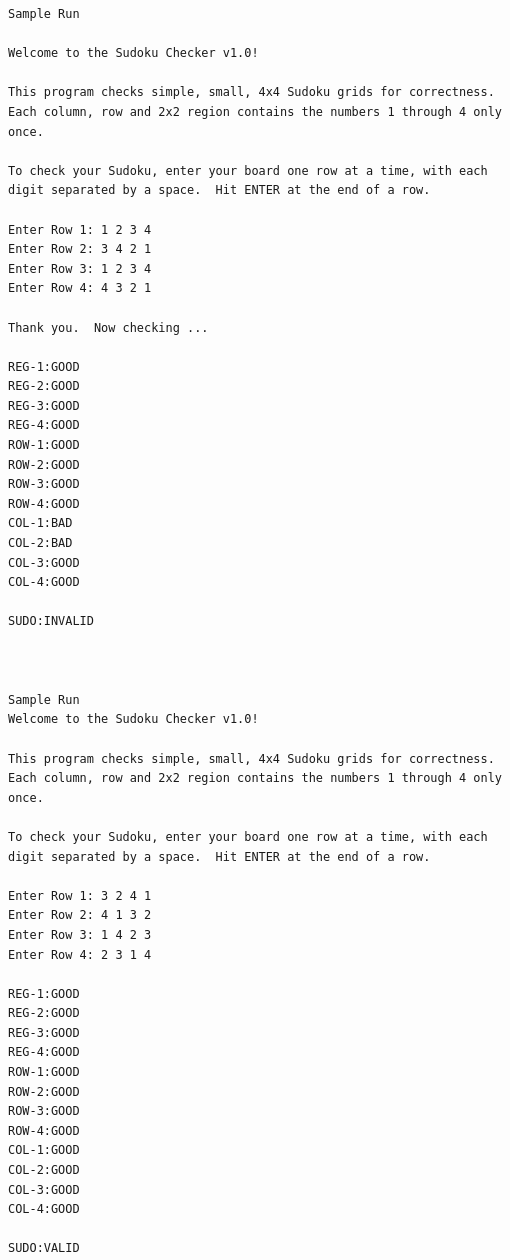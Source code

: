 \begin{verbatim}
Sample Run

Welcome to the Sudoku Checker v1.0!

This program checks simple, small, 4x4 Sudoku grids for correctness. Each column, row and 2x2 region contains the numbers 1 through 4 only once.

To check your Sudoku, enter your board one row at a time, with each digit separated by a space.  Hit ENTER at the end of a row.

Enter Row 1: 1 2 3 4
Enter Row 2: 3 4 2 1
Enter Row 3: 1 2 3 4
Enter Row 4: 4 3 2 1

Thank you.  Now checking ...

REG-1:GOOD
REG-2:GOOD
REG-3:GOOD
REG-4:GOOD
ROW-1:GOOD
ROW-2:GOOD
ROW-3:GOOD
ROW-4:GOOD
COL-1:BAD
COL-2:BAD
COL-3:GOOD
COL-4:GOOD

SUDO:INVALID



Sample Run
Welcome to the Sudoku Checker v1.0!

This program checks simple, small, 4x4 Sudoku grids for correctness. Each column, row and 2x2 region contains the numbers 1 through 4 only once.

To check your Sudoku, enter your board one row at a time, with each digit separated by a space.  Hit ENTER at the end of a row.

Enter Row 1: 3 2 4 1
Enter Row 2: 4 1 3 2
Enter Row 3: 1 4 2 3
Enter Row 4: 2 3 1 4

REG-1:GOOD
REG-2:GOOD
REG-3:GOOD
REG-4:GOOD
ROW-1:GOOD
ROW-2:GOOD
ROW-3:GOOD
ROW-4:GOOD
COL-1:GOOD
COL-2:GOOD
COL-3:GOOD
COL-4:GOOD

SUDO:VALID

\end{verbatim}




